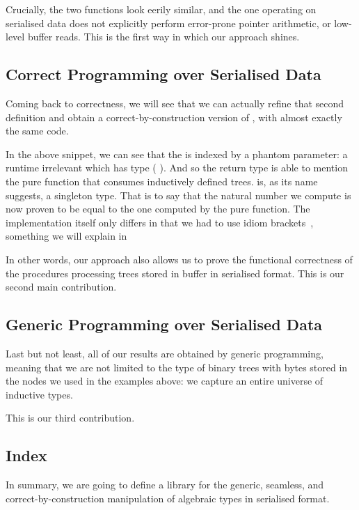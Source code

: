 Crucially, the two functions look eerily similar, and the one operating on
serialised data does not explicitly perform error-prone pointer arithmetic,
or low-level buffer reads. This is the first way in which our approach shines.


\subsection{Correct Programming over Serialised Data}

Coming back to correctness, we will see that we can actually refine that
second definition and obtain a correct-by-construction version of
, with almost exactly the same code.

\begin{center}
  \begin{minipage}{.7\textwidth}
  \end{minipage}
\end{center}

In the above snippet, we can see that the  is indexed
by a phantom parameter: a runtime irrelevant  which has type
( ).
%
And so the return type is able to mention the pure 
function that consumes inductively defined trees.
%
 is, as its name suggests, a singleton type. That is
to say that the natural number we compute is now proven to be equal to the
one computed by the pure  function.
%
The implementation itself only differs in that we had to use idiom
brackets~\cite{DBLP:journals/jfp/McbrideP08}, something we will explain
in 

In other words, our approach also allows us to prove the functional
correctness of the  procedures processing trees stored
in buffer in serialised format. This is our second main contribution.

\subsection{Generic Programming over Serialised Data}

Last but not least, all of our results are obtained by generic programming,
meaning that we are not limited to the type of binary trees with bytes stored
in the nodes we used in the examples above: we capture an entire universe of
inductive types.

This is our third contribution.

\subsection{Index}

In summary, we are going to define a library for the
generic,
seamless,
and correct-by-construction
manipulation of algebraic types in serialised format.



